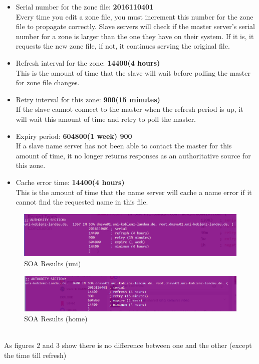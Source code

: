 \documentclass{WeSTassignment}
\begin{document}
\begin{enumerate}
\begin{itemize}
\item Serial number for the zone file: \textbf{2016110401} \\Every time you edit a zone file, you must increment this number for the zone file to propagate correctly. Slave servers will check if the master server's serial number for a zone is larger than the one they have on their system. If it is, it requests the new zone file, if not, it continues serving the original file.

\item Refresh interval for the zone: \textbf{ 14400(4 hours)}\\ This is the amount of time that the slave will wait before polling the master for zone file changes.

\item Retry interval for this zone: \textbf{900(15 minutes)}\\ If the slave cannot connect to the master when the refresh period is up, it will wait this amount of time and retry to poll the master.
\item Expiry period: \textbf{604800(1 week) 900}\\ If a slave name server has not been able to contact the master for this amount of time, it no longer returns responses as an authoritative source for this zone.

\item Cache error time: \textbf{14400(4 hours)}\\This is the amount of time that the name server will cache a name error if it cannot find the requested name in this file.
\end{itemize}

\begin{figure}[!ht]
\centering
\includegraphics[scale=0.7]{soa.png}
\caption{SOA Results (uni)}
	\label{fig:soa}
\end{figure}

\begin{figure}[!ht]
\centering
\includegraphics[scale=0.7]{soa_home.png}
\caption{SOA Results (home)}
	\label{fig:soa}
\end{figure}

\\As figures 2 and 3 show there is no difference between one and the other (except the time till refresh)

\end{enumerate}
\end{document}

